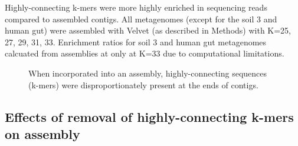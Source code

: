 \documentclass[11pt]{article} %
\begin{document}
\begin{table}
\caption{Highly-connecting k-mers were more highly enriched in sequencing reads compared to assembled contigs.  All metagenomes (except for the soil 3 and human gut) were assembled with Velvet (as described in Methods) with K=25, 27, 29, 31, 33.  Enrichment ratios for soil 3 and human gut metagenomes calcuated from assemblies at only at K=33 due to computational limitations.}
\end{table}

\begin{figure}
\caption{When incorporated into an assembly, highly-connecting sequences (k-mers) were disproportionately present at the ends of contigs.}
\end{figure}

\subsection{Effects of removal of highly-connecting k-mers on assembly}
\end{document}
